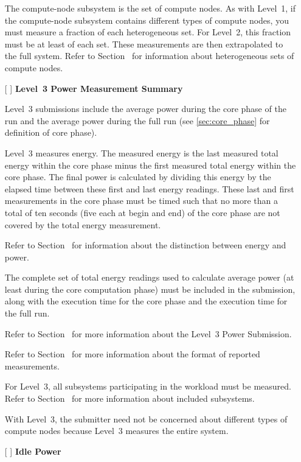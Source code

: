 \begin{itemize}
The compute-node subsystem is the set of compute nodes.
As with Level~1, if the compute-node subsystem contains different types of compute nodes, you must measure a fraction of each heterogeneous set.
For Level~2, this fraction must be at least \SpecFracMinLTwo{} of each set.
These measurements are then extrapolated to the full system.
Refer to Section~ for information about heterogeneous sets of compute nodes.

\item[{[ ]}]
\textbf{Level~3 Power Measurement Summary}

Level~3 submissions include the average power during the core phase of the run and the average power during the full run (see \ref{sec:core_phase} for definition of core phase).

Level~3 measures energy.
The measured energy is the last measured total energy within the core phase minus the first measured total energy within the core phase.
The final power is calculated by dividing this energy by the elapsed time between these first and last energy readings.
These last and first measurements in the core phase must be timed such that no more than a total of ten seconds (five each at begin and end) of the core phase are not covered by the total energy measurement.

Refer to Section~ for information about the distinction between energy and power.

The complete set of total energy readings used to calculate average power (at least \MinMeasurementsCorePhaseLTwoThree{} during the core computation phase) must be included in the submission, along with the execution time for the core phase and the execution time for the full run.

Refer to Section~ for more information about the Level~3 Power Submission.

Refer to Section~ for more information about the format of reported measurements.

For Level~3, all subsystems participating in the workload must be measured.
Refer to Section~ for more information about included subsystems.

With Level~3, the submitter need not be concerned about different types of compute nodes because Level~3 measures the entire system.


\item[{[ ]}]
\textbf{Idle Power}


\end{itemize}

